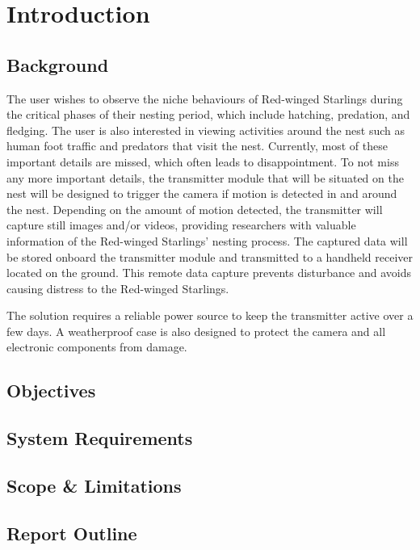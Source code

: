 \documentclass[class=report,11pt,crop=false]{standalone}
\begin{document}
\chapter{Introduction}



\section{Background}
The user wishes to observe the niche behaviours of Red-winged Starlings during the critical phases of their nesting period, which include hatching, predation, and fledging. The user is also interested in viewing activities around the nest such as human foot traffic and predators that visit the nest. Currently, most of these important details are missed, which often leads to disappointment. To not miss any more important details, the transmitter module that will be situated on the nest will be designed to trigger the camera if motion is detected in and around the nest. Depending on the amount of motion detected, the transmitter will capture still images and/or videos, providing researchers with valuable information of the Red-winged Starlings’ nesting process. The captured data will be stored onboard the transmitter module and transmitted to a handheld receiver located on the ground. This remote data capture prevents disturbance and avoids causing distress to the Red-winged Starlings. 

The solution requires a reliable power source to keep the transmitter active over a few days. A weatherproof case is also designed to protect the camera and all electronic components from damage. 

\section{Objectives}


\section{System Requirements}


\section{Scope \& Limitations}


\section{Report Outline}


\ifstandalone

\printnoidxglossary[type=\acronymtype,nonumberlist]
\fi
\end{document}
